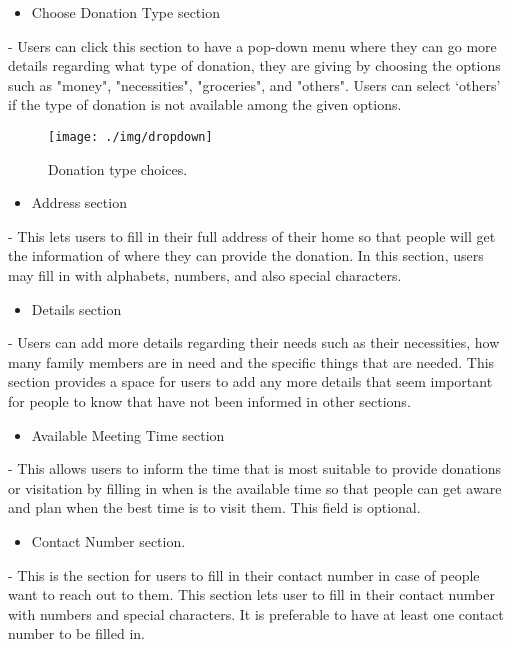 \documentclass[conference]{IEEEtran}
\begin{document}
\begin{itemize}
\item Choose Donation Type section
\end{itemize}
- Users can click this section to have a pop-down menu where they can go more details regarding what type of donation, they are giving by choosing the options such as "money", "necessities", "groceries", and "others". Users can select ‘others’ if the type of donation is not available among the given options. \\

\begin{figure}[h!]
\texttt{[image: ./img/dropdown]}
\centering
\caption{Donation type choices.}
\end{figure}

\begin{itemize}
\item Address section
\end{itemize}
- This lets users to fill in their full address of their home so that people will get the information of where they can provide the donation. In this section, users may fill in with alphabets, numbers, and also special characters. \\
 
\begin{itemize}
\item Details  section
\end{itemize}
- Users can add more details regarding their needs such as their necessities, how many family members are in need and the specific things that are needed. This section provides a space for users to add any more details that seem important for people to know that have not been informed in other sections. \\

\begin{itemize}
\item Available Meeting Time section
\end{itemize}
- This allows users to inform the time that is most suitable to provide donations or visitation by filling in when is the available time so that people can get aware and plan when the best time is to visit them. This field is optional.\\

\begin{itemize}
\item Contact Number section.
\end{itemize}
- This is the section for users to fill in their contact number in case of people want to reach out to them. This section lets user to fill in their contact number with numbers and special characters. It is preferable to have at least one contact number to be filled in.\\
\end{document}
